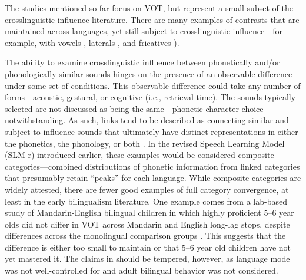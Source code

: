 The studies mentioned so far focus on VOT, but represent a small subset of the crosslinguistic influence literature. There are many examples of contrasts that are maintained across languages, yet still subject to crosslinguistic influence---for example, with vowels \citep{guion_2003_systems}, laterals \citep{amengual_2018_laterals,barlow_2014_aoa}, and fricatives \citep{peng_1993_influence}). %

The ability to examine crosslinguistic influence between phonetically and/or phonologically similar sounds hinges on the presence of an observable difference under some set of conditions. This observable difference could take any number of forms---acoustic, gestural, or cognitive (i.e., retrieval time). The sounds typically selected are not discussed as being the same---phonetic character choice notwithstanding. As such, links tend to be described as connecting similar and subject-to-influence sounds that ultimately have distinct representations in either the phonetics, the phonology, or both \citep{antoniou_2010_context,simonet_2016_bilingualism,bullock_2009_sociophonetics}. In the revised Speech Learning Model (SLM-r) \citep{flege_2021_slmr} introduced earlier, these examples would be considered composite categories---combined distributions of phonetic information from linked categories that presumably retain ``peaks'' for each language. While composite categories are widely attested, there are fewer good examples of full category convergence, at least in the early bilingualism literature. One example comes from a lab-based study of Mandarin-English bilingual children in which highly proficient 5--6 year olds did not differ in VOT across Mandarin and English long-lag stops, despite differences across the monolingual comparison groups \citep{yang_2019_vot}. This suggests that the difference is either too small to maintain or that 5--6 year old children have not yet mastered it. The claims in \citep{yang_2019_vot} should be tempered, however, as language mode was not well-controlled for and adult bilingual behavior was not considered. %

